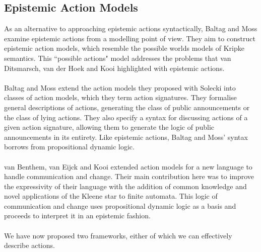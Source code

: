 \documentclass[10pt, a4paper, twoside]{article}
\begin{document}
\subsection{Epistemic Action Models} \label{act_mods}
As an alternative to approaching epistemic actions syntactically, Baltag and
Moss examine epistemic actions from a modelling point of view.
They aim to construct epistemic action models, which resemble the possible
worlds models of Kripke semantics.
This ``possible actions" model addresses the problems that van Ditsmarsch, van
der Hoek and Kooi highlighted with epistemic actions.\\
\\
Baltag and Moss extend the action models they proposed with Solecki into classes
of action models, which they term action signatures.
They formalise general descriptions of actions, generating the class of
public announcements or the class of lying actions.
They also specify a syntax for discussing actions of a given action signature,
allowing them to generate the logic of public announcements in its entirety.
Like epistemic actions, Baltag and Moss' syntax borrows from propositional
dynamic logic.\\
\\
van Benthem, van Eijck and Kooi extended action models for a new language to
handle communication and change.
Their main contribution here was to improve the expressivity of their language
with the addition of common knowledge and novel applications of the Kleene star
to finite automata.
This logic of communication and change uses propositional dynamic logic as a basis
and proceeds to interpret it in an epistemic fashion.\\
\\
We have now proposed two frameworks, either of which we can effectively describe
actions.

\end{document}
